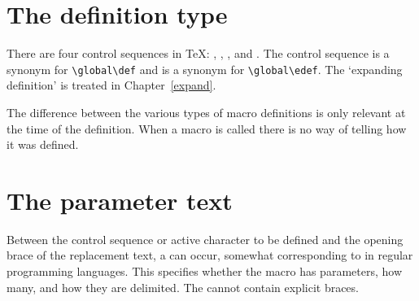\documentclass[letterpaper]{book}
\begin{document}
\section{The definition type}

There are four  control sequences in \TeX:
, , , and .
The control sequence 
\alt
{} is a synonym for \verb>\global\def> and
 is a synonym for \verb>\global\edef>.
The `expanding definition'  is treated in 
Chapter~\ref{expand}.

The difference between the various types of macro definitions
is only relevant at the time of the definition.
When a macro is called there is no way of telling how
it was defined.

\section{The parameter text}
\label{param:text}

Between the control sequence or active character to be defined
and the opening brace of the replacement text, a  can occur, somewhat corresponding to 
in regular programming languages. This specifies whether the macro has 
parameters,
how many, and how they are delimited. 
The  cannot contain
explicit braces.
\end{document}
